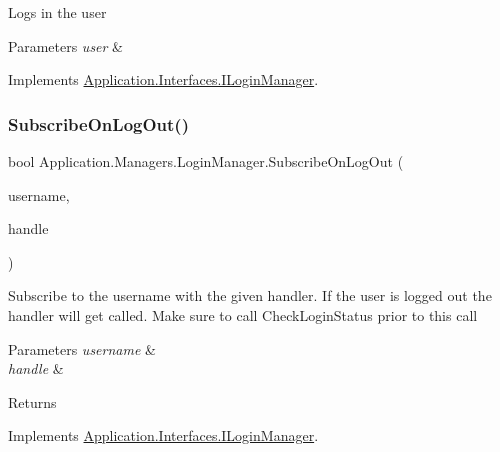 Logs in the user 


\begin{DoxyParams}{Parameters}
{\em user} & \\
\hline
\end{DoxyParams}


Implements \mbox{\hyperlink{interface_application_1_1_interfaces_1_1_i_login_manager_abfad12b55f211087464278f6301ba2e6}{Application.\+Interfaces.\+I\+Login\+Manager}}.

\mbox{\label{class_application_1_1_managers_1_1_login_manager_a9502ab9e9e8d04a42a9c3cdf451b405b}} 
\subsubsection{\texorpdfstring{Subscribe\+On\+Log\+Out()}{SubscribeOnLogOut()}}
{\footnotesize\ttfamily bool Application.\+Managers.\+Login\+Manager.\+Subscribe\+On\+Log\+Out (\begin{DoxyParamCaption}\item[{string}]{username,  }\item[{User\+Logged\+Out\+Handle}]{handle }\end{DoxyParamCaption})}



Subscribe to the username with the given handler. If the user is logged out the handler will get called. Make sure to call Check\+Login\+Status prior to this call 


\begin{DoxyParams}{Parameters}
{\em username} & \\
\hline
{\em handle} & \\
\hline
\end{DoxyParams}
\begin{DoxyReturn}{Returns}

\end{DoxyReturn}


Implements \mbox{\hyperlink{interface_application_1_1_interfaces_1_1_i_login_manager_a81fc028c701e8e372d635d6bd9664570}{Application.\+Interfaces.\+I\+Login\+Manager}}.

\mbox{\label{class_application_1_1_managers_1_1_login_manager_a4490bbdc301ad6eab762fd1a567fd970}} 

